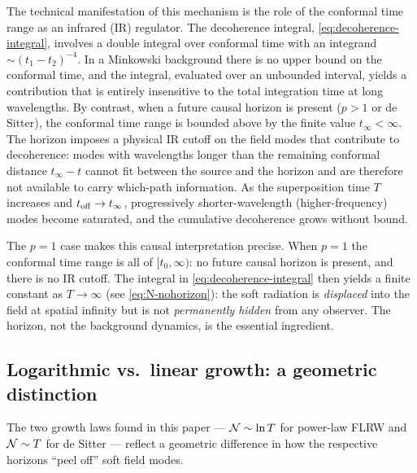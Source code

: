The technical manifestation of this mechanism is the role of the conformal time
range as an infrared (IR) regulator.  The decoherence integral,
\cref{eq:decoherence-integral}, involves a double integral over conformal
time with an integrand $\sim (t_1 - t_2)^{-4}$.  In a Minkowski background there
is no upper bound on the conformal time, and the integral, evaluated over an
unbounded interval, yields a contribution that is entirely insensitive to the total
integration time at long wavelengths.  By contrast, when a future causal horizon
is present ($p > 1$ or de Sitter), the conformal time range is bounded above by
the finite value $t_\infty < \infty$.  The horizon imposes a physical IR cutoff on
the field modes that contribute to decoherence: modes with wavelengths longer than
the remaining conformal distance $t_\infty - t$ cannot fit between the source and
the horizon and are therefore not available to carry which-path information.  As
the superposition time $T$ increases and $t_{\rm off} \to t_\infty$, progressively
shorter-wavelength (higher-frequency) modes become saturated, and the cumulative
decoherence grows without bound.

The $p = 1$ case makes this causal interpretation precise.  When $p = 1$ the
conformal time range is all of $[t_0, \infty)$: no future causal horizon is
present, and there is no IR cutoff.  The integral in \cref{eq:decoherence-integral}
then yields a finite constant as $T \to \infty$ (see \cref{eq:N-nohorizon}): the
soft radiation is \emph{displaced} into the field at spatial infinity but is not
\emph{permanently hidden} from any observer.  The horizon, not the background
dynamics, is the essential ingredient.

\subsection{Logarithmic vs.\ linear growth: a geometric distinction}
\label{sec:discussion-growth}

The two growth laws found in this paper — $\mathcal{N} \sim \ln T$ for power-law FLRW
and $\mathcal{N} \sim T$ for de Sitter — reflect a geometric difference in how the
respective horizons ``peel off'' soft field modes.

